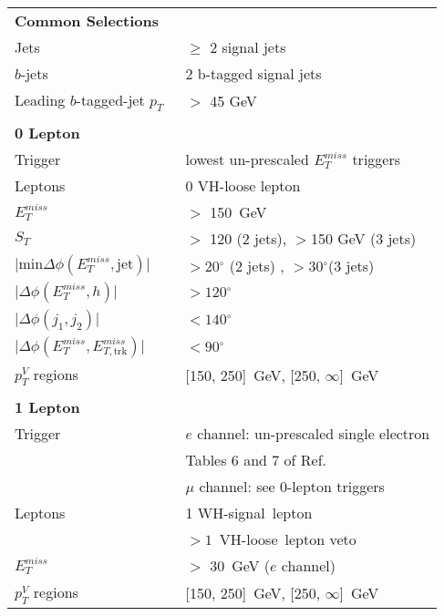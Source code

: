 \begin{table}[ht]
\begin{center}
\begin{tabular}{l l} 

\toprule
\multicolumn{2}{l}{\textbf{Common Selections}}\\

Jets & $\geq$  2 signal jets  \\
$b$-jets &  2 b-tagged signal jets \\
Leading $b$-tagged-jet $p_T$\  & $>$ 45 GeV \\

  &\\
\multicolumn{2}{l}{\textbf{0 Lepton}} \\

Trigger & lowest un-prescaled $E_T^{miss}$ triggers \\
Leptons & 0 VH-loose lepton \\
$E_T^{miss}$ & $>$ 150~GeV  \\

$S_T$ & $>$ 120 (2 jets), $>$150 GeV (3 jets)  \\
$\lvert \text{min} \Delta \phi (E_T^{miss}, \text{jet}) \rvert$ & $> 20\ensuremath{^\circ}$ (2 jets) , $> 30\ensuremath{^\circ}$(3 jets) \\
  $\lvert \Delta\phi(E_T^{miss}, h) \rvert$ & $> 120\ensuremath{^\circ}$ \\
$\lvert \Delta\phi(j_1, j_2) \rvert$ & $< 140\ensuremath{^\circ}$ \\
$\lvert \Delta\phi(E_T^{miss}, E_{T, \text{trk}}^{miss}) \rvert$ & $< 90\ensuremath{^\circ}$ \\
$p_T^V$ regions & [150, 250]~GeV, [250, $\infty$]~GeV  \\

&\\

\multicolumn{2}{l}{\textbf{1 Lepton}} \\

Trigger &  $e$ channel: un-prescaled single electron \\
        & Tables 6 and 7 of Ref.~\cite{VHobjectsupportnote}\\
	    & $\mu$ channel: see 0-lepton triggers \\
Leptons & 1 WH-signal\ lepton \\
        &  $>1$~VH-loose\ lepton veto \\
$E_T^{miss}$   & $>$ 30~GeV ($e$ channel) \\
$p_T^{V}$ regions & [150, 250]~GeV, [250, $\infty$]~GeV  \\ 


\end{tabular}
\end{center}
\end{table}
